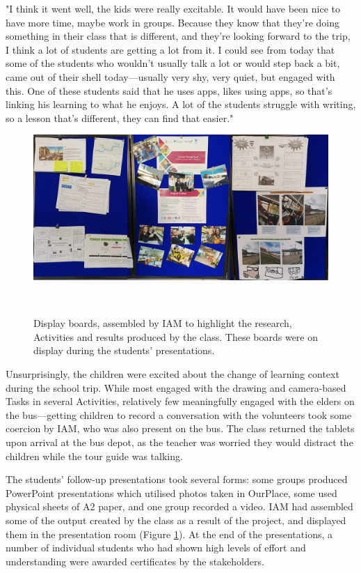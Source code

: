 \begin{displayquote}
"I think it went well, the kids were really excitable. It would have been nice to have more time, maybe work in groups. Because they know that they're doing something in their class that is different, and they're looking forward to the trip, I think a lot of students are getting a lot from it. I could see from today that some of the students who wouldn't usually talk a lot or would step back a bit, came out of their shell today---usually very shy, very quiet, but engaged with this. One of these students said that he uses apps, likes using apps, so that's linking his learning to what he enjoys. A lot of the students struggle with writing, so a lesson that's different, they can find that easier."
\end{displayquote}

\begin{figure}
\centering
  \includegraphics[width=1\columnwidth]{images/chapter08/displayBoards.jpg}
  \caption[Display boards showing students' work]{Display boards, assembled by IAM to highlight the research, Activities and results produced by the class. These boards were on display during the students' presentations.}~\label{fig:DisplayBoards}
\end{figure}

Unsurprisingly, the children were excited about the change of learning context during the school trip. While most engaged with the drawing and camera-based Tasks in several Activities, relatively few meaningfully engaged with the elders on the bus---getting children to record a conversation with the volunteers took some coercion by IAM, who was also present on the bus. The class returned the tablets upon arrival at the bus depot, as the teacher was worried they would distract the children while the tour guide was talking.

The students' follow-up presentations took several forms: some groups produced PowerPoint presentations which utilised photos taken in OurPlace, some used physical sheets of A2 paper, and one group recorded a video. IAM had assembled some of the output created by the class as a result of the project, and displayed them in the presentation room (Figure \ref{fig:DisplayBoards}). At the end of the presentations, a number of individual students who had shown high levels of effort and understanding were awarded certificates by the stakeholders.

